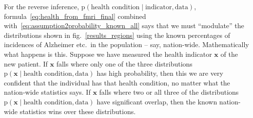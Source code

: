 \documentclass[\ifafour a4paper,12pt,\else a5paper,10pt,\fi%
onecolumn,oneside,article,%
british%
]{memoir}
\theoremstyle{remark}
\theoremstyle{innote}
\newcommand*{\pf}{\mathrm{p}}%
\renewcommand*{\|}{\mathpunct{|}}
\newcommand*{\fig}{fig.}%
\newcommand*{\etc}{{etc.}}
\newcommand*{\yx}{x}
\newcommand*{\yxx}{\bm{\yx}}
\newcommand*{\data}{\text{data}}
\theoremstyle{plain}
\begin{document}


For the reverse inference,
$\pf(\text{health condition} \| \text{indicator}, \data)$,
formula~\eqref{eq:health_from_fmri_final} combined
with~\eqref{eq:assumption2probability_known_all} says that we must
\enquote{modulate} the distributions shown in \fig~\ref{results_regions}
using the known percentages of incidences of Alzheimer \etc\ in the
population -- say, nation-wide. Mathematically what happens is this.
Suppose we have measured the health indicator $\yxx$ of the new patient. If
$\yxx$ falls where only one of the three distributions
$\pf(\yxx \| \text{health condition}, \data)$ has high probability,
then this we are very confident that the individual has that health
condition, no matter what the nation-wide statistics says. If $\yxx$ falls
where two or all three of the distributions
$\pf(\yxx \| \text{health condition}, \data)$ have significant
overlap, then the known nation-wide statistics wins over these
distributions.

\bigskip
\end{document}

